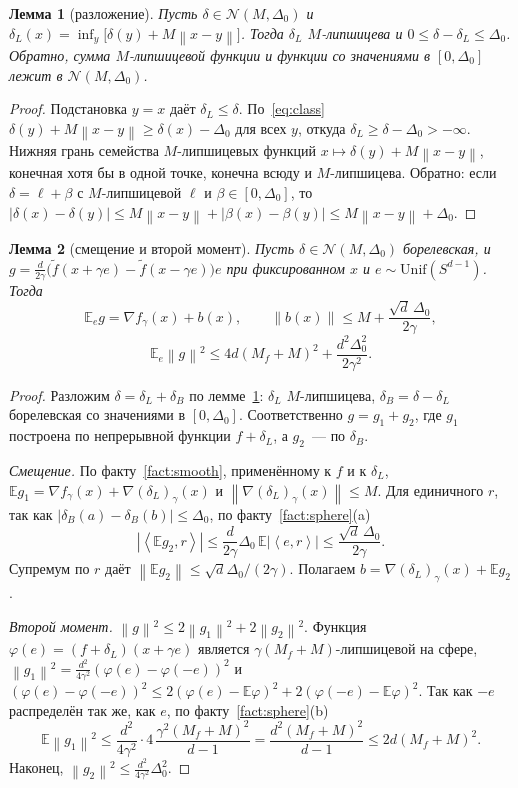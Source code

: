 \documentclass[12pt,a4paper]{article}
\theoremstyle{plain}
\newtheorem{lemma}{Лемма}
\theoremstyle{definition}
\theoremstyle{remark}
\newcommand{\E}{\mathbb{E}}
\newcommand{\norm}[1]{\left\lVert #1\right\rVert}
\newcommand{\abs}[1]{\left\lvert #1\right\rvert}
\newcommand{\ip}[2]{\left\langle #1,#2\right\rangle}
\begin{document}
\begin{lemma}[разложение]\label{lem:decomp}
Пусть $\delta\in\mathcal N(M,\Delta_0)$ и $\delta_L(x)=\inf_y\bigl[\delta(y)+M\norm{x-y}\bigr]$. Тогда $\delta_L$ $M$-липшицева и $0\le\delta-\delta_L\le\Delta_0$. Обратно, сумма $M$-липшицевой функции и функции со значениями в $[0,\Delta_0]$ лежит в $\mathcal N(M,\Delta_0)$.
\end{lemma}
\begin{proof}
Подстановка $y=x$ даёт $\delta_L\le\delta$. По~\eqref{eq:class} $\delta(y)+M\norm{x-y}\ge\delta(x)-\Delta_0$ для всех $y$, откуда $\delta_L\ge\delta-\Delta_0>-\infty$. Нижняя грань семейства $M$-липшицевых функций $x\mapsto\delta(y)+M\norm{x-y}$, конечная хотя бы в одной точке, конечна всюду и $M$-липшицева. Обратно: если $\delta=\ell+\beta$ с $M$-липшицевой $\ell$ и $\beta\in[0,\Delta_0]$, то $\abs{\delta(x)-\delta(y)}\le M\norm{x-y}+\abs{\beta(x)-\beta(y)}\le M\norm{x-y}+\Delta_0$.
\end{proof}

\begin{lemma}[смещение и второй момент]\label{lem:bias}
Пусть $\delta\in\mathcal N(M,\Delta_0)$ борелевская, и $g=\frac d{2\gamma}\bigl(\tilde f(x+\gamma e)-\tilde f(x-\gamma e)\bigr)e$ при фиксированном $x$ и $e\sim\mathrm{Unif}(S^{d-1})$. Тогда
\begin{equation}\label{eq:bias}
  \E_eg=\nabla f_\gamma(x)+b(x),\qquad\norm{b(x)}\le M+\frac{\sqrt d\,\Delta_0}{2\gamma},
\end{equation}
\begin{equation}\label{eq:moment}
  \E_e\norm g^2\le4d(M_f+M)^2+\frac{d^2\Delta_0^2}{2\gamma^2}.
\end{equation}
\end{lemma}
\begin{proof}
Разложим $\delta=\delta_L+\delta_B$ по лемме~\ref{lem:decomp}: $\delta_L$ $M$-липшицева, $\delta_B=\delta-\delta_L$ борелевская со значениями в $[0,\Delta_0]$. Соответственно $g=g_1+g_2$, где $g_1$ построена по непрерывной функции $f+\delta_L$, а $g_2$~--- по $\delta_B$.

\emph{Смещение.} По факту~\ref{fact:smooth}, применённому к $f$ и к $\delta_L$, $\E g_1=\nabla f_\gamma(x)+\nabla(\delta_L)_\gamma(x)$ и $\norm{\nabla(\delta_L)_\gamma(x)}\le M$. Для единичного $r$, так как $\abs{\delta_B(a)-\delta_B(b)}\le\Delta_0$, по факту~\ref{fact:sphere}(a)
\[
  \abs{\ip{\E g_2}r}\le\frac d{2\gamma}\Delta_0\,\E\abs{\ip er}\le\frac{\sqrt d\,\Delta_0}{2\gamma}.
\]
Супремум по $r$ даёт $\norm{\E g_2}\le\sqrt d\Delta_0/(2\gamma)$. Полагаем $b=\nabla(\delta_L)_\gamma(x)+\E g_2$.

\emph{Второй момент.} $\norm g^2\le2\norm{g_1}^2+2\norm{g_2}^2$. Функция $\varphi(e)=(f+\delta_L)(x+\gamma e)$ является $\gamma(M_f+M)$-липшицевой на сфере, $\norm{g_1}^2=\frac{d^2}{4\gamma^2}(\varphi(e)-\varphi(-e))^2$ и $(\varphi(e)-\varphi(-e))^2\le2(\varphi(e)-\E\varphi)^2+2(\varphi(-e)-\E\varphi)^2$. Так как $-e$ распределён так же, как $e$, по факту~\ref{fact:sphere}(b)
\[
  \E\norm{g_1}^2\le\frac{d^2}{4\gamma^2}\cdot4\,\frac{\gamma^2(M_f+M)^2}{d-1}=\frac{d^2(M_f+M)^2}{d-1}\le2d(M_f+M)^2 .
\]
Наконец, $\norm{g_2}^2\le\frac{d^2}{4\gamma^2}\Delta_0^2$.
\end{proof}
\end{document}

